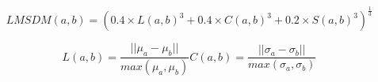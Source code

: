 
\begin{equation}
LMSDM(a,b) = (0.4\times L(a,b)^3+0.4\times C(a,b)^3+0.2\times S(a,b)^3)^{\frac{1}{3}}
\end{equation}

\begin{equation}
 L(a,b) = \frac{||\mu_a-\mu_b||}{max(\mu_a, \mu_b)}
 C(a,b) = \frac{||\sigma_a-\sigma_b||}{max(\sigma_a, \sigma_b)}
\end{equation}